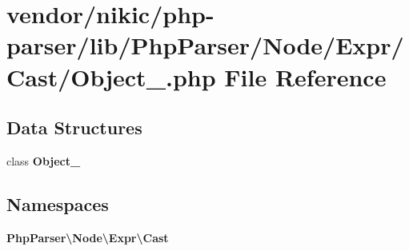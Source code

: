 \section{vendor/nikic/php-\/parser/lib/\+Php\+Parser/\+Node/\+Expr/\+Cast/\+Object\+\_\+.php File Reference}
\label{_object___8php}
\subsection*{Data Structures}
\begin{DoxyCompactItemize}
\item 
class {\bf Object\+\_\+}
\end{DoxyCompactItemize}
\subsection*{Namespaces}
\begin{DoxyCompactItemize}
\item 
 {\bf Php\+Parser\textbackslash{}\+Node\textbackslash{}\+Expr\textbackslash{}\+Cast}
\end{DoxyCompactItemize}
